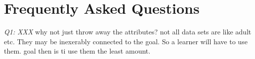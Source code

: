 % 



 





\section{Frequently Asked Questions}\label{tion:faq}
{\em Q1: XXX}
 why not just throw away the attributes? not all data sets are like adult etc. They may be inexerably
 connected to the goal. So a learner will have to use them. goal then is ti use them the least amount.
 
